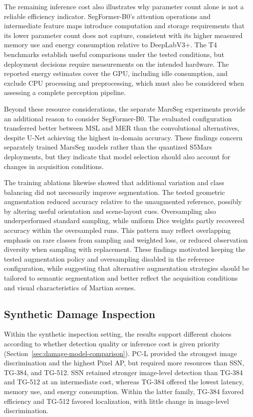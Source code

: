 The remaining inference cost also illustrates why parameter count alone is not a reliable efficiency indicator. SegFormer-B0's attention operations and intermediate feature maps introduce computation and storage requirements that its lower parameter count does not capture, consistent with its higher measured memory use and energy consumption relative to DeepLabV3+.
The T4 benchmarks establish useful comparisons under the tested conditions, but deployment decisions require measurements on the intended hardware. The reported energy estimates cover the GPU, including idle consumption, and exclude CPU processing and preprocessing, which must also be considered when assessing a complete perception pipeline.

Beyond these resource considerations, the separate MarsSeg experiments provide an additional reason to consider SegFormer-B0. The evaluated configuration transferred better between MSL and MER than the convolutional alternatives, despite U-Net achieving the highest in-domain accuracy. These findings concern separately trained MarsSeg models rather than the quantized S5Mars deployments, but they indicate that model selection should also account for changes in acquisition conditions.

The training ablations likewise showed that additional variation and class balancing did not necessarily improve segmentation. The tested geometric augmentation reduced accuracy relative to the unaugmented reference, possibly by altering useful orientation and scene-layout cues. Oversampling also underperformed standard sampling, while uniform Dice weights partly recovered accuracy within the oversampled runs. This pattern may reflect overlapping emphasis on rare classes from sampling and weighted loss, or reduced observation diversity when sampling with replacement. These findings motivated keeping the tested augmentation policy and oversampling disabled in the reference configuration, while suggesting that alternative augmentation strategies should be tailored to semantic segmentation and better reflect the acquisition conditions and visual characteristics of Martian scenes.

\subsection{Synthetic Damage Inspection}
\label{sec:discussion-damage-inspection}

Within the synthetic inspection setting, the results support different choices according to whether detection quality or inference cost is given priority (Section~\ref{sec:damage-model-comparison}). PC-L provided the strongest image discrimination and the highest Pixel AP, but required more resources than SSN, TG-384, and TG-512. SSN retained stronger image-level detection than TG-384 and TG-512 at an intermediate cost, whereas TG-384 offered the lowest latency, memory use, and energy consumption. Within the latter family, TG-384 favored efficiency and TG-512 favored localization, with little change in image-level discrimination.

